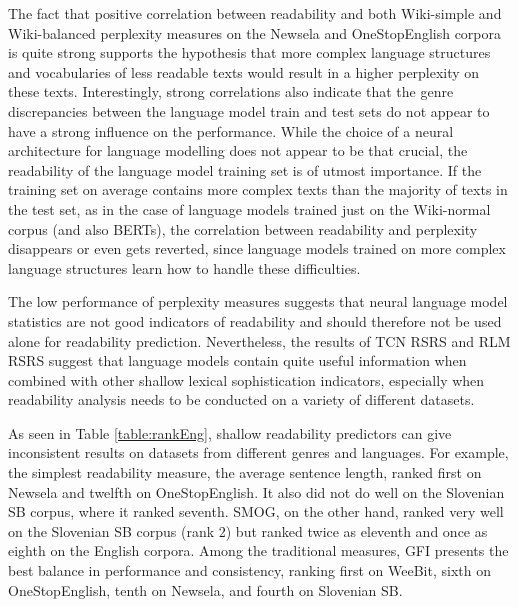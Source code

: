 \documentclass{clv3}
\begin{document}
The fact that positive correlation between readability and both Wiki-simple and Wiki-balanced perplexity measures on the Newsela and OneStopEnglish corpora is quite strong supports the hypothesis that more complex language structures and vocabularies of less readable texts would result in a higher perplexity on these texts. Interestingly, strong correlations also indicate that the genre discrepancies between the language model train and test sets do not appear to have a strong influence on the performance. While the choice of a neural architecture for language modelling does not appear to be that crucial, the readability of the language model training set is of utmost importance. If the training set on average contains more complex texts than the majority of texts in the test set, as in the case of language models trained just on the Wiki-normal corpus (and also BERTs), the correlation between readability and perplexity disappears or even gets reverted, since language models trained on more complex language structures learn how to handle these difficulties. 

The low performance of perplexity measures suggests that neural language model statistics are not good indicators of readability and should therefore not be used alone for readability prediction. Nevertheless, the results of TCN RSRS and RLM RSRS suggest that language models contain quite useful information when combined with other shallow lexical sophistication indicators, especially when readability analysis needs to be conducted on a variety of different datasets. 

As seen in Table \ref{table:rankEng}, shallow readability predictors can give inconsistent results on datasets from different genres and languages. For example, the simplest readability measure, the average sentence length, ranked first on Newsela and twelfth on OneStopEnglish. It also did not do well on the Slovenian SB corpus, where it ranked seventh. SMOG, on the other hand, ranked very well on the Slovenian SB corpus (rank 2) but ranked twice as eleventh and once as eighth on the English corpora. Among the traditional measures, GFI presents the best balance in performance and consistency, ranking first on WeeBit, sixth on OneStopEnglish, tenth on Newsela, and fourth on Slovenian SB.
\end{document}
